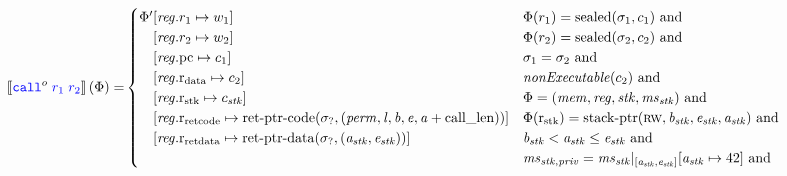 \documentclass[a3paper]{article}
\newcommand{\sem}[1]{\left\llbracket #1 \right\rrbracket}
\newcommand{\tand}{\text{ and }}
\newcommand{\sourcecolor}{\color{blue}}
\newcommand{\src}[1]{{\sourcecolor #1}}
\newcommand{\zinstr}[1]{\texttt{#1}}
\newcommand{\scall}[4][]{  
\ifthenelse{\equal{#3#4}{}}
  {\ensuremath{\zinstr{\src{call}}_{#1}^{#2}}}
  {\ensuremath{\zinstr{\src{call}}_{#1}^{#2} \; #3 \; #4}}
}
\newcommand{\update}[2]{[#1 \mapsto #2]}
\newcommand{\updReg}[2]{\update{\reg.#1}{#2}}
\newcommand{\shareddom}[1]{\mathrm{#1}}
\newcommand{\perm}{\var{perm}}
\newcommand{\lin}{\var{l}}
\newcommand{\stkptr}[1]{\mathrm{stack\text{-}ptr}(#1)}
\newcommand{\retptrd}{\mathrm{ret\text{-}ptr\text{-}data}}
\newcommand{\retptrc}{\mathrm{ret\text{-}ptr\text{-}code}}
\newcommand{\sealed}[1]{\shareddom{sealed}(#1)}
\newcommand{\var}[1]{\mathit{#1}}
\newcommand{\reg}{\var{reg}}
\newcommand{\mem}{\var{mem}}
\newcommand{\ms}{\var{ms}}
\newcommand{\stk}{\var{stk}}
\newcommand{\priv}{\var{priv}}
\newcommand{\baddr}{\var{b}}
\newcommand{\eaddr}{\var{e}}
\newcommand{\aaddr}{\var{a}}
\newcommand{\constant}[1]{\mathrm{#1}}
\newcommand{\calllen}{\constant{call\_len}}
\newcommand{\pcreg}{\mathrm{pc}}
\newcommand{\rstk}{\mathrm{r}_\mathrm{stk}}
\newcommand{\rretc}{\mathrm{r}_\mathrm{ret code}}
\newcommand{\rretd}{\mathrm{r}_\mathrm{ret data}}
\newcommand{\rdata}{\mathrm{r}_\mathrm{data}}
\newcommand{\plainperm}[1]{\textsc{#1}}
\newcommand{\rw}{\plainperm{rw}}
\newcommand{\plainfun}[2]{
  \ifthenelse{\equal{#2}{}}
  {\mathit{#1}}
  {\mathit{#1}(#2)}
}
\newcommand{\nonExec}[1]{\plainfun{nonExecutable}{#1}}
\begin{document}
\begin{align*}
  \sem{\scall{o}{\src{r_1}}{\src{r_2}}}(\Phi) = & 
                                               \begin{cases}
                                                 \Phi'
                                                 \arraycolsep=0pt
                                                 \begin{array}[t]{rl}
                                                   &\updReg{r_1}{w_1} \\
                                                        &\updReg{r_2}{w_2} \\
                                                        &\updReg{\pcreg}{c_1}\\
                                                        &\updReg{\rdata}{c_2}\\
                                                        &\updReg{\rstk}{c_\stk}\\
                                                        &\updReg{\rretc}{\retptrc(\sigma_?,(\perm,\lin,\baddr,\eaddr,\aaddr+\calllen))}\\
                                                        &\updReg{\rretd}{\retptrd(\sigma_?,(\aaddr_\stk,\eaddr_\stk))}
                                                 \end{array}
                                                 & 
                                                 \arraycolsep=0pt
                                                 \begin{array}[t]{l}
                                                   \Phi(r_1) = \sealed{\sigma_1,c_1} \tand \\
                                                   \Phi(r_2) = \sealed{\sigma_2,c_2} \tand \\
                                                   \sigma_1 = \sigma_2 \tand \\
                                                   \nonExec{c_2} \tand\\
                                                   \Phi = (\mem,\reg,\stk,\ms_\stk) \tand\\
                                                   \Phi(\rstk) = \stkptr{\rw,\baddr_\stk,\eaddr_\stk,\aaddr_\stk} \tand \\
                                                   \baddr_\stk < \aaddr_\stk \leq \eaddr_\stk \tand \\
                                                   \ms_{\stk,\priv} = \ms_\stk |_{[\aaddr_\stk,\eaddr_\stk]}\update{\aaddr_\stk}{42} \tand\\

\end{array}
\end{cases}
\end{align*}
\end{document}
